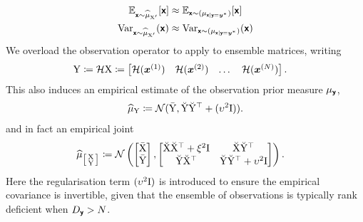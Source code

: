 \documentclass[wcp]{jmlr} %
\begin{document}
\begin{align}
    \Ex_{\vrv{x}\sim \ELaw[\mm{X}']}[ \vrv{x}] &\approx \Ex_{\vrv{x}\sim (\Law[\vrv{x} \gvn \vrv{y}=\vv{y}^*])} [\vrv{x}]\\
    \var_{\vrv{x}\sim \ELaw[\mm{X}']} (\vrv{x}) &\approx \var_{\vrv{x}\sim (\Law[\vrv{x} \gvn \vrv{y}=\vv{y}^*])} (\vrv{x})
\end{align}
We overload the observation operator to apply to ensemble matrices, writing
\begin{align}
    \mathrm{Y}\coloneq\mathcal{H}\mathrm{X} &\coloneq \begin{bmatrix}\mathcal{H}(\boldsymbol{x}^{(1)}) & \mathcal{H}(\boldsymbol{x}^{(2)})& \dots& \mathcal{H}(\boldsymbol{x}^{(N)})\end{bmatrix}.
\end{align}
This also induces an empirical estimate of the observation prior measure $\Law[\vrv{y}]$,
\begin{align}
    \ELaw[\mm{Y}]
    \coloneq \Normal(\mmmean{Y}, \mmdev{Y} \mmdev{Y}^\top + (\upsilon^2\mm{I})).
\end{align}
and in fact an empirical joint
\begin{align}
    \ELaw[{\left[\begin{smallmatrix}
        \mm{X}\\
        \mm{Y}
    \end{smallmatrix}\right]}] &\coloneq \Normal\left(\begin{bmatrix}
        \mmmean{X}\\
        \mmmean{Y}
    \end{bmatrix},
    \begin{bmatrix}
        \mmdev{X} \mmdev{X}^\top + \xi^2\mm{I} & \mmdev{X} \mmdev{Y}^\top \\
        \mmdev{Y} \mmdev{X}^\top  & \mmdev{Y} \mmdev{Y}^\top + \upsilon^2\mm{I}
    \end{bmatrix}
    \right).\label{eq:ensemble-joint}
\end{align}
Here the regularisation term $(\upsilon^2\mathrm{I})$ is introduced to ensure the empirical covariance is invertible, given that the ensemble of observations is typically rank deficient when $D_{\boldsymbol{\mathsf{y}}}>N$.
\end{document}
